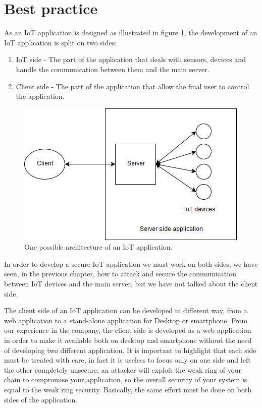 \section{Best practice}
As an IoT application is designed as illustrated in figure \ref{fig:best0}, the development of an IoT application is split on two sides:
\begin{enumerate}
	\item IoT side - The part of the application that deals with sensors, devices and handle the communication between them and the main server.
	\item Client side - The part of the application that allow the final user to control the application.
\end{enumerate}


	\begin{figure}
	\includegraphics[width=\linewidth]{bestpractice-img0.png}
	\caption{One possible architecture of an IoT application.}
	\label{fig:best0}
\end{figure}

In order to develop a secure IoT application we must work on both sides, we have seen, in the previous chapter, how to attack and secure the communication between IoT devices and the main server, but we have not talked about the client side.\newline

The client side of an IoT application can be developed in different way, from a web application to a stand-alone application for Desktop or smartphone.\newline
From our experience in the company, the client side is developed as a web application in order to make it available both on desktop and smartphone without the need of developing two different application.\newline
It is important to highlight that each side must be treated with care, in fact it is useless to focus only on one side and left the other completely unsecure; an attacker will exploit the weak ring of your chain to compromise your application, so the overall security of your system is equal to the weak ring security.\newline
Basically, the same effort must be done on both sides of the application.\newline

